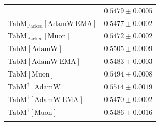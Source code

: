 \begin{longtable}{p{}p{}}
{\begin{tabular}{ll}
{\footnotesize $\mathrm{TabM_{\text{Packed}}[AdamW]}$ } & {\footnotesize$0.5479 \pm 0.0005$}\\ 
{\footnotesize $\mathrm{TabM_{\text{Packed}}[AdamW\ EMA]}$ } & {\footnotesize$0.5477 \pm 0.0002$}\\ 
{\footnotesize $\mathrm{TabM_{\text{Packed}}[Muon]}$ } & {\footnotesize$0.5472 \pm 0.0002$}\\ 
{\footnotesize $\mathrm{TabM[AdamW]}$ } & {\footnotesize$0.5505 \pm 0.0009$}\\ 
{\footnotesize $\mathrm{TabM[AdamW\ EMA]}$ } & {\footnotesize$0.5483 \pm 0.0003$}\\ 
{\footnotesize $\mathrm{TabM[Muon]}$ } & {\footnotesize$0.5494 \pm 0.0008$}\\ 
{\footnotesize $\mathrm{TabM^\dagger[AdamW]}$ } & {\footnotesize$0.5514 \pm 0.0019$}\\ 
{\footnotesize $\mathrm{TabM^\dagger[AdamW\ EMA]}$ } & {\footnotesize$0.5470 \pm 0.0002$}\\ 
{\footnotesize $\mathrm{TabM^\dagger[Muon]}$ } & {\footnotesize$0.5486 \pm 0.0016$}\\ 
\bottomrule
\end{tabular}}

&

\topalign{
\centering
\setlength\tabcolsep{2.5pt}
\renewcommand{\arraystretch}{0.8}
\begin{tabular}{ll}


\end{tabular}}
\end{longtable}
